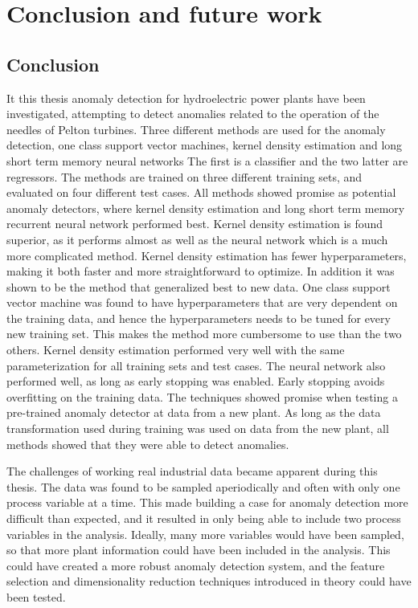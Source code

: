\chapter{Conclusion and future work}\label{cha:conclusions}
%

\section{Conclusion}
    
    It this thesis anomaly detection for hydroelectric power plants have been investigated, attempting to detect anomalies related to the operation of the needles of Pelton turbines. Three different methods are used for the anomaly detection, one class support vector machines, kernel density estimation and long short term memory neural networks The first is a classifier and the two latter are regressors. The methods are trained on three different training sets, and evaluated on four different test cases. All methods showed promise as potential anomaly detectors, where kernel density estimation and long short term memory recurrent neural network performed best. Kernel density estimation is found superior, as it performs almost as well as the neural network which is a much more complicated method. Kernel density estimation has fewer hyperparameters, making it both faster and more straightforward to optimize. In addition it was shown to be the method that generalized best to new data. One class support vector machine was found to have hyperparameters that are very dependent on the training data, and hence the hyperparameters needs to be tuned for every new training set. This makes the method more cumbersome to use than the two others. Kernel density estimation performed very well with the same parameterization for all training sets and test cases. The neural network also performed well, as long as early stopping was enabled. Early stopping avoids overfitting on the training data. The techniques showed promise when testing a pre-trained anomaly detector at data from a new plant. As long as the data transformation used during training was used on data from the new plant, all methods showed that they were able to detect anomalies.           
    
    The challenges of working real industrial data became apparent during this thesis. The data was found to be sampled aperiodically and often with only one process variable at a time. This made building a case for anomaly detection more difficult than expected, and it resulted in only being able to include two process variables in the analysis. Ideally, many more variables would have been sampled, so that more plant information could have been included in the analysis. This could have created a more robust anomaly detection system, and the feature selection and dimensionality reduction techniques introduced in theory could have been tested. 
    
